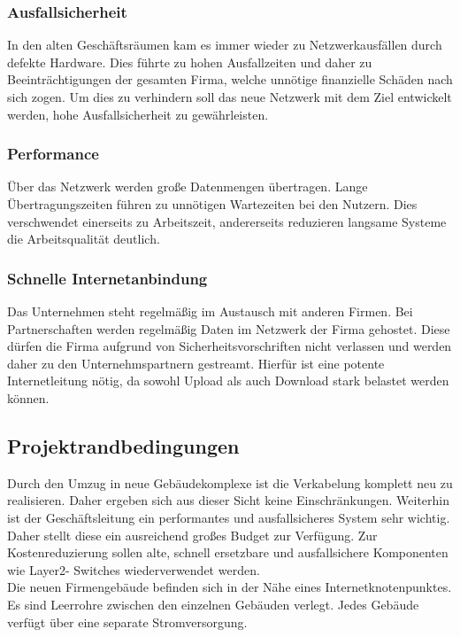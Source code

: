 \documentclass[a4paper,11pt]{article}
\begin{document}
\subsubsection{Ausfallsicherheit}
In den alten Geschäftsräumen kam es immer wieder zu Netzwerkausfällen durch defekte Hardware. Dies führte zu hohen Ausfallzeiten und daher zu Beeinträchtigungen der gesamten Firma, welche unnötige finanzielle Schäden nach sich zogen. Um dies zu verhindern soll das neue Netzwerk mit dem Ziel entwickelt werden, hohe Ausfallsicherheit zu gewährleisten.

\subsubsection{Performance}
Über das Netzwerk werden große Datenmengen übertragen. Lange Übertragungszeiten führen zu unnötigen Wartezeiten bei den Nutzern. Dies verschwendet einerseits zu Arbeitszeit, andererseits reduzieren langsame Systeme die Arbeitsqualität deutlich.

\subsubsection{Schnelle Internetanbindung}
Das Unternehmen steht regelmäßig im Austausch mit anderen Firmen. Bei Partnerschaften werden regelmäßig Daten im Netzwerk der Firma gehostet. Diese dürfen die Firma aufgrund von Sicherheitsvorschriften nicht verlassen und werden daher zu den Unternehmspartnern gestreamt. Hierfür ist eine potente Internetleitung nötig, da sowohl Upload als auch Download stark belastet werden können.

\subsection{Projektrandbedingungen}
Durch den Umzug in neue Gebäudekomplexe ist die Verkabelung komplett neu zu realisieren. Daher ergeben sich aus dieser Sicht keine Einschränkungen.
Weiterhin ist der Geschäftsleitung ein performantes und ausfallsicheres System sehr wichtig. Daher stellt diese ein ausreichend großes Budget zur Verfügung. Zur Kostenreduzierung sollen alte, schnell ersetzbare und ausfallsichere Komponenten wie Layer2- Switches wiederverwendet werden.
\\
Die neuen Firmengebäude befinden sich in der Nähe eines Internetknotenpunktes. Es sind Leerrohre zwischen den einzelnen Gebäuden verlegt. Jedes Gebäude verfügt über eine separate Stromversorgung.
\end{document}
